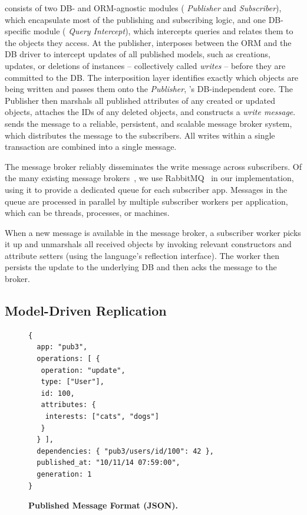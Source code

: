 \synapse consists of two DB- and ORM-agnostic modules ({\em \synapse
Publisher} and {\em \synapse Subscriber}), which encapsulate most of the
publishing and subscribing logic, and one DB-specific module ({\em \synapse
Query Intercept}), which intercepts queries and relates them to the objects they
access. At the publisher, \synapse interposes between the ORM and the DB
driver to intercept updates of all published models, such as creations, updates,
or deletions of instances -- collectively called {\em writes} -- before they are
committed to the DB. The interposition layer identifies exactly which objects
are being written and passes them onto the {\em \synapse Publisher},
\synapse's DB-independent core. The Publisher then marshals all published
attributes of any created or updated objects, attaches the IDs of any deleted
objects, and constructs a {\em write message}. \synapse sends the message to a
reliable, persistent, and scalable message broker system, which distributes the
message to the subscribers. All writes within a single transaction are combined
into a single message.

The message broker reliably disseminates the write message across subscribers.
Of the many existing message brokers~\cite{jms,kafka,rabbitmq},
we use RabbitMQ~\cite{rabbitmq} in our implementation, using it to provide a
dedicated queue for each subscriber app. Messages in the queue are processed in
parallel by multiple subscriber workers per application, which can be threads,
processes, or machines.

When a new message is available in the message broker, a \synapse subscriber
worker picks it up and unmarshals all received objects by invoking relevant
constructors and attribute setters (using the language's reflection interface).
The worker then persists the update to the underlying DB and then acks the
message to the broker.


\subsection{Model-Driven Replication}
\label{synapse:sec:arch:cross-db-propagation}


\begin{figure}[t]
 \centering
 \begin{minipage}{.65\textwidth}
  \begin{rbox}

    \small
\begin{lstlisting}[basicstyle=\ttfamily]
{
  app: "pub3",
  operations: [ {
   operation: "update",
   type: ["User"],
   id: 100,
   attributes: {
    interests: ["cats", "dogs"]
   }
  } ],
  dependencies: { "pub3/users/id/100": 42 },
  published_at: "10/11/14 07:59:00",
  generation: 1
}
  \end{lstlisting}
  \end{rbox}
 \end{minipage}
 \caption{{\bf Published Message Format (JSON).}}
 \label{synapse:fig:json}
\end{figure}


